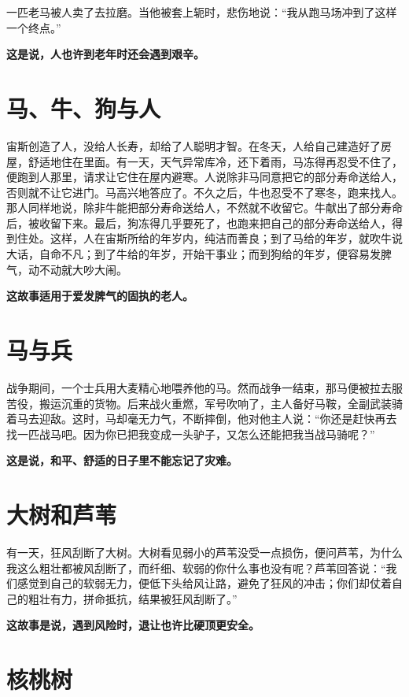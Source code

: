 一匹老马被人卖了去拉磨。当他被套上轭时，悲伤地说：“我从跑马场冲到了这样一个终点。”

{\bfseries \color{red}这是说，人也许到老年时还会遇到艰辛。}

\section{马、牛、狗与人}

宙斯创造了人，没给人长寿，却给了人聪明才智。在冬天，人给自己建造好了房屋，舒适地住在里面。有一天，天气异常库冷，还下着雨，马冻得再忍受不住了，便跑到人那里，请求让它住在屋内避寒。人说除非马同意把它的部分寿命送给人，否则就不让它进门。马高兴地答应了。不久之后，牛也忍受不了寒冬，跑来找人。那人同样地说，除非牛能把部分寿命送给人，不然就不收留它。牛献出了部分寿命后，被收留下来。最后，狗冻得几乎要死了，也跑来把自己的部分寿命送给人，得到住处。这样，人在宙斯所给的年岁内，纯洁而善良；到了马给的年岁，就吹牛说大话，自命不凡；到了牛给的年岁，开始干事业；而到狗给的年岁，便容易发脾气，动不动就大吵大闹。

{\bfseries \color{red}这故事适用于爱发脾气的固执的老人。}

\section{马与兵}

战争期间，一个士兵用大麦精心地喂养他的马。然而战争一结束，那马便被拉去服苦役，搬运沉重的货物。后来战火重燃，军号吹响了，主人备好马鞍，全副武装骑着马去迎敌。这时，马却毫无力气，不断摔倒，他对他主人说：“你还是赶快再去找一匹战马吧。因为你已把我变成一头驴子，又怎么还能把我当战马骑呢？”

{\bfseries \color{red}这是说，和平、舒适的日子里不能忘记了灾难。}

\section{大树和芦苇}

有一天，狂风刮断了大树。大树看见弱小的芦苇没受一点损伤，便问芦苇，为什么我这么粗壮都被风刮断了，而纤细、软弱的你什么事也没有呢？芦苇回答说：“我们感觉到自己的软弱无力，便低下头给风让路，避免了狂风的冲击；你们却仗着自己的粗壮有力，拼命抵抗，结果被狂风刮断了。”

{\bfseries \color{red}这故事是说，遇到风险时，退让也许比硬顶更安全。}

\section{核桃树}

